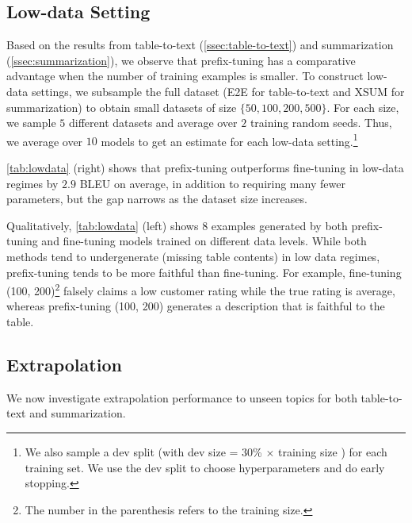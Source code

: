 \subsection{Low-data Setting}
\label{sec:lowdata}

Based on the results from table-to-text (\ref{ssec:table-to-text}) and summarization (\ref{ssec:summarization}), we observe that prefix-tuning has a comparative advantage when the number of training examples is smaller. To construct low-data settings, we subsample the full dataset (E2E for table-to-text and XSUM for summarization) to obtain small datasets of size $\{ 50, 100, 200, 500 \}$. For each size, we sample $5$ different datasets and average over $2$ training random seeds. Thus, we average over $10$ models to get an estimate for each low-data setting.\footnote{We also sample a dev split (with dev size = 30\% $\times$ training size ) for each training set. We use the dev split to choose hyperparameters and do early stopping.}

\ref{tab:lowdata} (right) shows that prefix-tuning outperforms fine-tuning in low-data regimes by $2.9$ BLEU on average, in addition to requiring many fewer parameters, but the gap narrows as the dataset size increases. 

Qualitatively, \ref{tab:lowdata} (left) shows $8$ examples generated by both prefix-tuning and fine-tuning models trained on different data levels. While both methods tend to undergenerate (missing table contents) in low data regimes, prefix-tuning tends to be more faithful than fine-tuning.  For example, fine-tuning (100, 200)\footnote{The number in the parenthesis refers to the training size.} falsely claims a low customer rating while the true rating is average, whereas prefix-tuning (100, 200) generates a description that is faithful to the table. 

\subsection{Extrapolation}
\label{sec:extrapolation}

We now investigate extrapolation performance to unseen topics for both table-to-text and summarization. 

